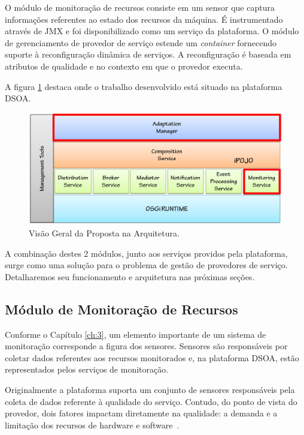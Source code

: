 O módulo de monitoração de recursos consiste em um sensor que captura informações referentes ao estado dos recursos da máquina. É instrumentado através de JMX e foi disponibilizado como um serviço da plataforma. O módulo de gerenciamento de provedor de serviço estende um \textit{container} fornecendo suporte à reconfiguração dinâmica de serviços. A reconfiguração é baseada em atributos de qualidade e no contexto em que o provedor executa.

A figura \ref{fig:proposal} destaca onde o trabalho desenvolvido está situado na plataforma DSOA.

\begin{figure}[htp]
\centering
\includegraphics[width=13cm]{chapters/chapter4/dsoa-provider-manager.png}
\caption[Visão Geral da Proposta na Arquitetura]{Visão Geral da Proposta na Arquitetura.}
\label{fig:proposal}
\end{figure}

A combinação destes 2 módulos, junto aos serviços providos pela plataforma, surge como uma solução para o problema de gestão de provedores de serviço. Detalharemos seu funcionamento e arquitetura nas próximas seções.


\subsection{Módulo de Monitoração de Recursos}

Conforme o Capítulo \ref{ch:3}, um elemento importante de um sistema de monitoração corresponde a figura dos sensores. Sensores são responsáveis por coletar dados referentes aos recursos monitorados e, na plataforma DSOA, estão representados pelos serviços de monitoração. 

Originalmente a plataforma suporta um conjunto de sensores responsáveis pela coleta de dados referente à qualidade do serviço. Contudo, do ponto de vista do provedor, dois fatores impactam diretamente na qualidade: a demanda e a limitação dos recursos de hardware e software~\cite{ye2011models}. 

